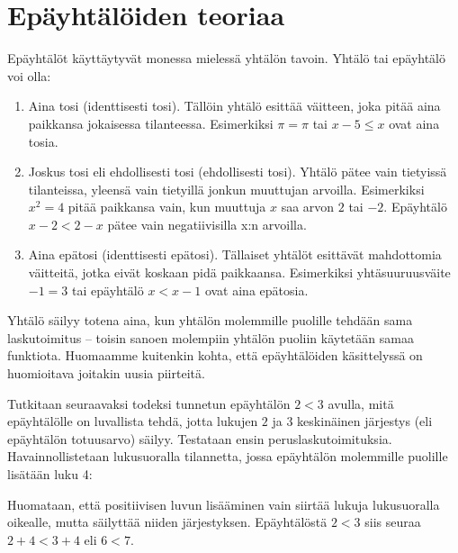 \section{Epäyhtälöiden teoriaa}

Epäyhtälöt käyttäytyvät monessa mielessä yhtälön tavoin. Yhtälö tai epäyhtälö voi olla:

\begin{enumerate}
\item Aina tosi (identtisesti tosi). Tällöin yhtälö esittää väitteen, joka pitää aina paikkansa jokaisessa tilanteessa. Esimerkiksi $\pi=\pi$ tai $x-5\leq x$ ovat aina tosia.
\item Joskus tosi eli ehdollisesti tosi (ehdollisesti tosi). Yhtälö pätee vain tietyissä tilanteissa, yleensä vain tietyillä jonkun muuttujan arvoilla. Esimerkiksi $x^2=4$ pitää paikkansa vain, kun muuttuja $x$ saa arvon $2$ tai $-2$. Epäyhtälö $x-2<2-x$ pätee vain negatiivisilla x:n arvoilla.
\item Aina epätosi (identtisesti epätosi). Tällaiset yhtälöt esittävät mahdottomia väitteitä, jotka eivät koskaan pidä paikkaansa. Esimerkiksi yhtäsuuruusväite $-1=3$ tai epäyhtälö $x < x-1$ ovat aina epätosia.
\end{enumerate}

Yhtälö säilyy totena aina, kun yhtälön molemmille puolille tehdään sama laskutoimitus -- toisin sanoen molempiin yhtälön puoliin käytetään samaa funktiota. Huomaamme kuitenkin kohta, että epäyhtälöiden käsittelyssä on huomioitava joitakin uusia piirteitä.

Tutkitaan seuraavaksi todeksi tunnetun epäyhtälön $2<3$ avulla, mitä epäyhtälölle on luvallista tehdä, jotta lukujen $2$ ja $3$ keskinäinen järjestys (eli epäyhtälön totuusarvo) säilyy. Testataan ensin peruslaskutoimituksia. Havainnollistetaan lukusuoralla tilannetta, jossa epäyhtälön molemmille puolille lisätään luku 4:

\begin{lukusuora}{-1}{10}{12}

\lukusuorauusi
\end{lukusuora}

Huomataan, että positiivisen luvun lisääminen vain siirtää lukuja lukusuoralla oikealle, mutta säilyttää niiden järjestyksen. Epäyhtälöstä $2<3$ siis seuraa $2+4<3+4$ eli $6<7$.

